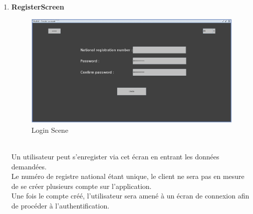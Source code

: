 \documentclass[../rapport.tex]{subfiles}
\begin{document}
\begin{enumerate}
\item \textbf{RegisterScreen} \\
		\begin{figure}[h!]
				\centering \includegraphics[scale=0.2]{ressources/photos_diagrammes/app1/gui/createAccount.jpg}
				\caption{Login Scene}
		\end{figure}
		\\
Un utilisateur peut s'enregister via cet écran en entrant les données demandées.\\
Le numéro de registre national étant unique, le client ne sera pas en mesure de se créer plusieurs compte sur l'application.\\
Une fois le compte créé, l'utilisateur sera amené à un écran de connexion afin de procéder à l'authentification.


\end{enumerate}
\end{document}
